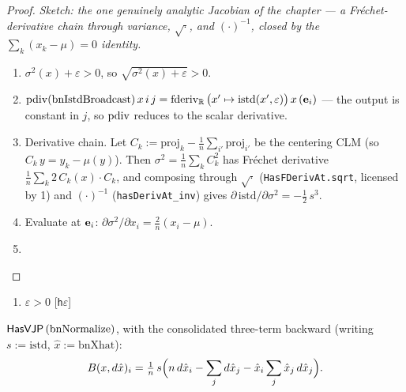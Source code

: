 \begin{proof}
\leanok
\emph{Sketch: the one genuinely analytic Jacobian of the chapter ---
a Fréchet-derivative chain through variance, \(\sqrt{\cdot}\), and
\(({\cdot})^{-1}\), closed by the \(\sum_k (x_k - \mu) = 0\)
identity.}
\begin{enumerate}
  \item \(\sigma^2(x) + \varepsilon > 0\), so
    \(\sqrt{\sigma^2(x) + \varepsilon} > 0\).
  \item \(\operatorname{pdiv}(\operatorname{bnIstdBroadcast})\, x\, i\, j
          = \operatorname{fderiv}_{\mathbb{R}}\,\bigl(x' \mapsto \mathrm{istd}(x', \varepsilon)\bigr)\, x\, (\mathbf{e}_i)\)
    --- the output is constant in \(j\), so \(\operatorname{pdiv}\) reduces to the
    scalar derivative.
  \item Derivative chain. Let \(C_k := \mathrm{proj}_k -
    \tfrac{1}{n}\sum_{i'} \mathrm{proj}_{i'}\) be the centering CLM
    (so \(C_k\, y = y_k - \mu(y)\)). Then
    \(\sigma^2 = \tfrac{1}{n}\sum_k C_k^2\) has Fréchet derivative
    \(\tfrac{1}{n}\sum_k 2\, C_k(x) \cdot C_k\), and composing
    through \(\sqrt{\cdot}\) (\texttt{HasFDerivAt.sqrt}, licensed by
    1) and \(({\cdot})^{-1}\) (\texttt{hasDerivAt\_inv}) gives
    \(\partial\, \mathrm{istd} / \partial \sigma^2
      = -\tfrac{1}{2}\, s^3\).
  \item Evaluate at \(\mathbf{e}_i\):
    \(\partial \sigma^2 / \partial x_i = \tfrac{2}{n}(x_i - \mu)\).
  \item \Qed{}
\end{enumerate}
\end{proof}

\begin{theorem}
  \label{thm:bnNormalizeHasVJP}
  \leanok
  \Assume{}
  \begin{enumerate}
    \item \(\varepsilon > 0\) \hfill[\texttt{h\(\varepsilon\)}]
  \end{enumerate}
  \Prove{} \(\mathsf{HasVJP}\, (\mathrm{bnNormalize})\), with the consolidated
  three-term backward (writing \(s := \mathrm{istd}\),
  \(\hat{x} := \mathrm{bnXhat}\)):
  \[
    B(x, d\hat{x})_i = \tfrac{1}{n}\, s \Bigl(
      n\, d\hat{x}_i - \sum_j d\hat{x}_j
      - \hat{x}_i \sum_j \hat{x}_j\, d\hat{x}_j \Bigr).
  \]
\end{theorem}

